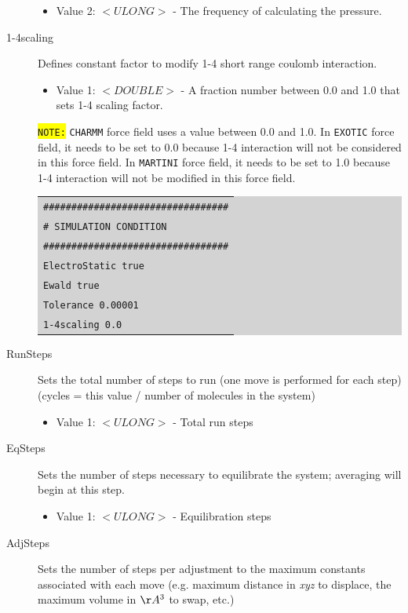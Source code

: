 \begin{description}
\begin{itemize}
	\item Value 2: $<ULONG>$ - The frequency of calculating the pressure.
	\end{itemize}
\item [1-4scaling] Defines constant factor to modify 1-4 short range coulomb interaction.
	\begin{itemize}
	\item Value 1: $<DOUBLE>$ - A fraction number between 0.0 and 1.0 that sets 1-4 scaling factor.
	\end{itemize}
	\colorbox{yellow}{\texttt{NOTE:}} \texttt{CHARMM} force field uses a value between 0.0 and 1.0. In \texttt{EXOTIC} force field, it needs to be set to 0.0 because 1-4 interaction will not be considered in this force field. In \texttt{MARTINI} force field, it needs to be set to 1.0 because 1-4 interaction will not be modified in this force field.\\
	\colorbox{lightgray}{
	\begin{tabular}{l}
	\texttt{\#\#\#\#\#\#\#\#\#\#\#\#\#\#\#\#\#\#\#\#\#\#\#\#\#\#\#\#\#\#\#\#\#}\\
	\texttt{\# SIMULATION CONDITION}\\
	\texttt{\#\#\#\#\#\#\#\#\#\#\#\#\#\#\#\#\#\#\#\#\#\#\#\#\#\#\#\#\#\#\#\#\#}\\
	\texttt{ElectroStatic 		true}\\
	\texttt{Ewald		   		true}\\
	\texttt{Tolerance	        	0.00001}\\
	\texttt{1-4scaling			0.0}\\
	\end{tabular}}
\item [RunSteps] Sets the total number of steps to run (one move is performed for each step) (cycles = this value / number of molecules in the system)
	\begin{itemize}
	\item Value 1: $<ULONG>$ - Total run steps
	\end{itemize}
\item [EqSteps] Sets the number of steps necessary to equilibrate the system; averaging will begin at this step.
	\begin{itemize}
	\item Value 1: $<ULONG>$ - Equilibration steps
	\end{itemize}
\item [AdjSteps] Sets the number of steps per adjustment to the maximum constants associated with each move (e.g. maximum distance in \textit{xyz} to displace, the maximum volume in $\AA^3$ to swap, etc.)

\end{description}
